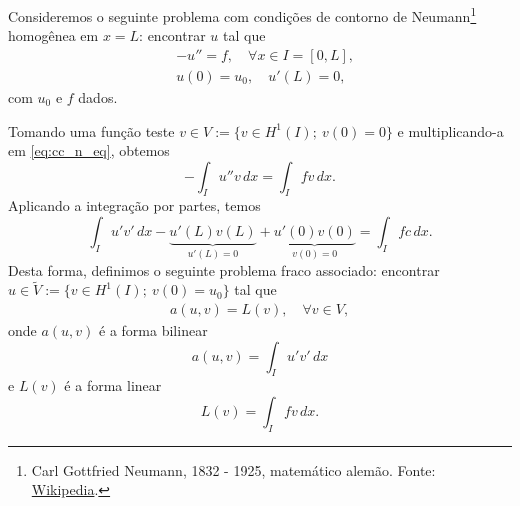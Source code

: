 Consideremos o seguinte problema com condições de contorno de Neumann\footnote{Carl Gottfried Neumann, 1832 - 1925, matemático alemão. Fonte: \href{https://en.wikipedia.org/wiki/Carl_Neumann}{Wikipedia}.} homogênea em $x=L$: encontrar $u$ tal que
\begin{align}
  &-u'' = f,\quad \forall x\in I=[0, L],\label{eq:cc_n_eq}\\
  &u(0) = u_0,\quad u'(L) = 0,\label{eq:cc_n_bc}
\end{align}
com $u_0$ e $f$ dados.

Tomando uma função teste $v\in V:=\{v\in H^1(I);~v(0)=0\}$ e multiplicando-a em \eqref{eq:cc_n_eq}, obtemos
\begin{equation}
  - \int_I u''v\,dx = \int_I fv\,dx.
\end{equation}
Aplicando a integração por partes, temos
\begin{equation}
  \int_I u'v'\,dx - \underbrace{u'(L)v(L)}_{u'(L)=0} + \underbrace{u'(0)v(0)}_{v(0)=0} = \int_I fc\,dx.
\end{equation}
Desta forma, definimos o seguinte problema fraco associado: encontrar $u\in \tilde{V} := \{v\in H^1(I);~v(0)=u_0\}$ tal que
\begin{align}
  a(u,v) = L(v),\quad\forall v\in V,
\end{align}
onde $a(u,v)$ é a forma bilinear
\begin{equation}\label{eq:cc_n_bilinear}
  a(u,v) = \int_I u'v'\,dx
\end{equation}
e $L(v)$ é a forma linear
\begin{equation}\label{eq:cc_n_linear}
  L(v) = \int_I fv\,dx.
\end{equation}

